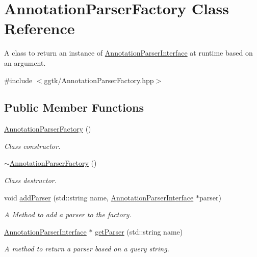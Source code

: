 \hypertarget{classAnnotationParserFactory}{}\section{Annotation\+Parser\+Factory Class Reference}
\label{classAnnotationParserFactory}


A class to return an instance of \hyperlink{classAnnotationParserInterface}{Annotation\+Parser\+Interface} at runtime based on an argument.  




{\ttfamily \#include $<$ggtk/\+Annotation\+Parser\+Factory.\+hpp$>$}

\subsection*{Public Member Functions}
\begin{DoxyCompactItemize}
\item 
\hyperlink{classAnnotationParserFactory_a47c5872562fa644ef911a7fc864ce26b}{Annotation\+Parser\+Factory} ()
\begin{DoxyCompactList}\small\item\em Class constructor. \end{DoxyCompactList}\item 
\hyperlink{classAnnotationParserFactory_ac1afbb3d17ddf112831c333c992cec5b}{$\sim$\+Annotation\+Parser\+Factory} ()
\begin{DoxyCompactList}\small\item\em Class destructor. \end{DoxyCompactList}\item 
void \hyperlink{classAnnotationParserFactory_a86063c95063074e551e9900b9c5ffe87}{add\+Parser} (std\+::string name, \hyperlink{classAnnotationParserInterface}{Annotation\+Parser\+Interface} $\ast$parser)
\begin{DoxyCompactList}\small\item\em A Method to add a parser to the factory. \end{DoxyCompactList}\item 
\hyperlink{classAnnotationParserInterface}{Annotation\+Parser\+Interface} $\ast$ \hyperlink{classAnnotationParserFactory_a746a9345db03fb484b446111ceb43fe9}{get\+Parser} (std\+::string name)
\begin{DoxyCompactList}\small\item\em A method to return a parser based on a query string. \end{DoxyCompactList}\end{DoxyCompactItemize}


